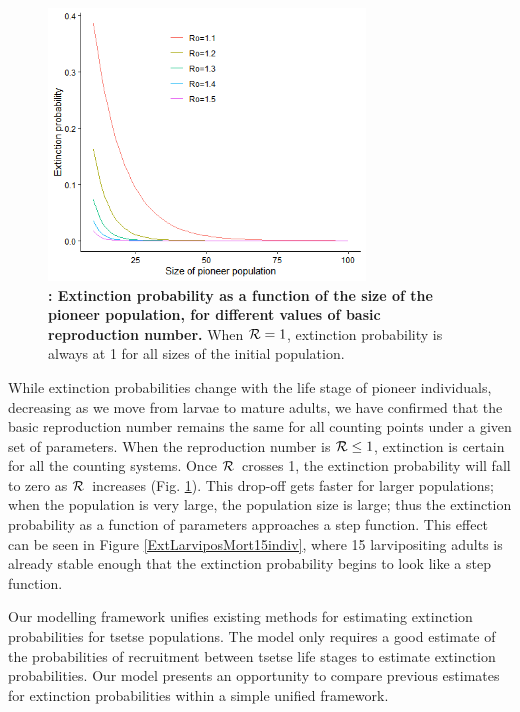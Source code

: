 \documentclass[smallextended]{svjour3}
\newcommand{\Rx}{\ensuremath{\cal R}}
\begin{document}
\begin{figure}[h]
	\includegraphics[width=0.75\textwidth]{ExtinctionRepNumberPoineerPop.png}
	\caption{{\bf: Extinction probability as a function of the size of the pioneer population, for different values of basic reproduction number.} When ${\cal R}=1$, extinction probability is always at 1 for all sizes of the initial population.}
	\label{ExtPoineerSize}
\end{figure}


While extinction probabilities change with the life stage of pioneer individuals, decreasing as we move from larvae to mature adults,  we have confirmed that the basic reproduction number remains the same for all counting points under a given set of parameters. When the reproduction number is ${\cal R} \leq 1$, extinction is certain for all the counting systems. Once \Rx\ crosses 1, the extinction probability will fall to zero as \Rx\ increases (Fig. \ref{ExtPoineerSize}). This drop-off gets faster for larger populations; when the population is very large, the population size is large; thus the extinction probability as a function of parameters approaches a step function. This effect can be seen in Figure \ref{ExtLarviposMort15indiv}, where 15 larvipositing adults is already stable enough that the extinction probability begins to look like a step function.

Our modelling framework unifies existing methods for estimating extinction probabilities for tsetse populations. The model only requires a good estimate of the probabilities of recruitment between tsetse life stages to estimate extinction probabilities. Our model presents an opportunity to compare previous estimates for extinction probabilities within a simple unified framework.
\end{document}
